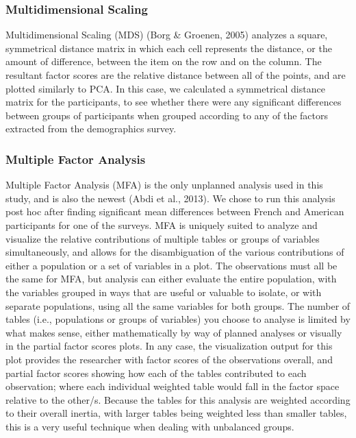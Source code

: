 \documentclass[
  english,
  man,floatsintext]{apa6}
\begin{document}
\hypertarget{multidimensional-scaling}{%
\subsubsection{Multidimensional Scaling}\label{multidimensional-scaling}}

Multidimensional Scaling (MDS) (Borg \& Groenen, 2005) analyzes a square, symmetrical distance matrix in which each cell represents the distance, or the amount of difference, between the item on the row and on the column. The resultant factor scores are the relative distance between all of the points, and are plotted similarly to PCA. In this case, we calculated a symmetrical distance matrix for the participants, to see whether there were any significant differences between groups of participants when grouped according to any of the factors extracted from the demographics survey.

\hypertarget{multiple-factor-analysis}{%
\subsubsection{Multiple Factor Analysis}\label{multiple-factor-analysis}}

Multiple Factor Analysis (MFA) is the only unplanned analysis used in this study, and is also the newest (Abdi et al., 2013). We chose to run this analysis post hoc after finding significant mean differences between French and American participants for one of the surveys. MFA is uniquely suited to analyze and visualize the relative contributions of multiple tables or groups of variables simultaneously, and allows for the disambiguation of the various contributions of either a population or a set of variables in a plot. The observations must all be the same for MFA, but analysis can either evaluate the entire population, with the variables grouped in ways that are useful or valuable to isolate, or with separate populations, using all the same variables for both groups. The number of tables (i.e., populations or groups of variables) you choose to analyse is limited by what makes sense, either mathematically by way of planned analyses or visually in the partial factor scores plots. In any case, the visualization output for this plot provides the researcher with factor scores of the observations overall, and partial factor scores showing how each of the tables contributed to each observation; where each individual weighted table would fall in the factor space relative to the other/s. Because the tables for this analysis are weighted according to their overall inertia, with larger tables being weighted less than smaller tables, this is a very useful technique when dealing with unbalanced groups.
\end{document}
